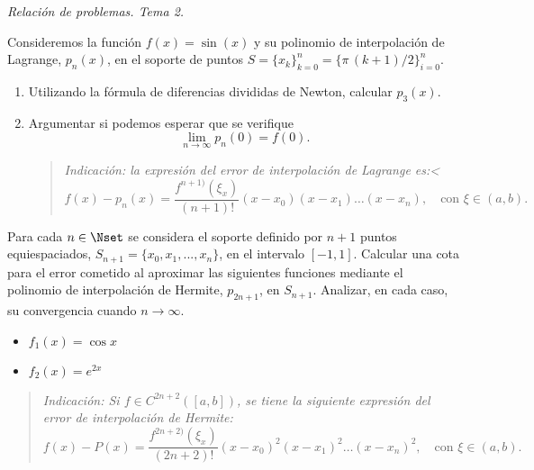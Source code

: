 \documentclass[11pt]{article}
\begin{document}
\begin{flushright}
  \LARGE\it Relación de problemas. Tema \huge 2.\\
  \bigskip
\end{flushright}

\begin{problemas}

  \begin{problema}
    Consideremos la función $f(x)=\sin(x)$ y su polinomio de
    interpolación de Lagrange, $p_n(x)$, en el soporte de puntos
    $S=\{x_k\}_{k=0}^n= \{\pi\,(k+1)/2\}_{i=0}^n$.
    \begin{enumerate}
    \item Utilizando la fórmula de diferencias divididas de Newton,
      calcular $p_3(x)$.
    \item Argumentar si podemos esperar que se verifique 
      $$
      \lim_{n\to\infty} p_n(0) = f(0).
      $$    
      \begin{quote}\em\small
      Indicación: la expresión del error de interpolación de Lagrange es:<
      \begin{equation*}
        f(x)-p_n(x)=\frac{f^{n+1)}(\xi_x)}{(n+1)!}
        (x-x_0)(x-x_1)\dots(x-x_n), \quad\text{con } \xi\in (a,b).
      \end{equation*}
    \end{quote}
  \end{enumerate}
  \end{problema}
  
  \begin{problema}
    Para cada $n\in\Nset$ se considera el soporte definido por $n+1$
    puntos equiespaciados, $S_{n+1}=\{x_0,x_1,...,x_n\}$, en el intervalo
    $[-1,1]$.  Calcular una cota para el error cometido al aproximar
    las siguientes funciones mediante el polinomio de interpolación
    de Hermite, $p_{2n+1}$, en $S_{n+1}$. Analizar, en cada caso, su
    convergencia cuando $n\to\infty$.
    \begin{itemize}
    \item $\displaystyle f_1(x)=\cos x$
    \item $\displaystyle f_2(x)=e^{2x}$
    \end{itemize}
    \begin{quote}\em\small
      Indicación: Si $f\in C^{2n+2}([a,b])$, se tiene la siguiente
      expresión del error de interpolación de Hermite: 
      \begin{equation*}
        f(x)-P(x)=\frac{f^{2n+2)}(\xi_x)}{(2n+2)!}
        (x-x_0)^2(x-x_1)^2\dots(x-x_n)^2, \quad\text{con } \xi\in (a,b).
      \end{equation*}
    \end{quote}
  \end{problema}
  

\end{problemas}
\end{document}

